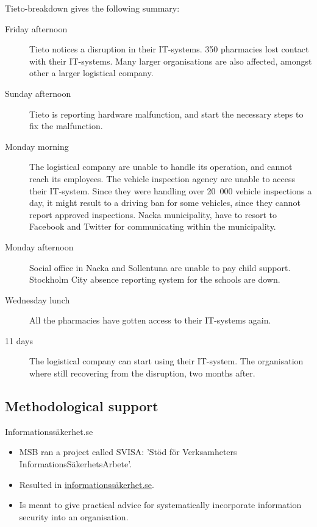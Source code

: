 \documentclass{beamer}
\begin{document}
\begin{frame}[allowframebreaks]{Tieto-breakdown}
  \cite{Lindkvist2012tdf} gives the following summary:
  \begin{description}
    \item[Friday afternoon] Tieto notices a disruption in their IT-systems.
      350 pharmacies lost contact with their IT-systems.
      Many larger organisations are also affected, amongst other a larger
      logistical company.

    \item[Sunday afternoon] Tieto is reporting hardware malfunction, and start
     the necessary steps to fix the malfunction.

    \item[Monday morning] The logistical company are unable to handle its
      operation, and cannot reach its employees.
      The vehicle inspection agency are unable to access their IT-system. Since
      they were handling over 20\, 000 vehicle inspections a day, it might
      result to a driving ban for some vehicles, since they cannot report
      approved inspections.
      Nacka municipality, have to resort to Facebook and Twitter for
      communicating within the municipality.

    \item[Monday afternoon] Social office in Nacka and Sollentuna are unable to
      pay child support.
      Stockholm City absence reporting system for the schools are down.

    \item[Wednesday lunch] All the pharmacies have gotten access to their
      IT-systems again.

    \item[11 days] The logistical company can start using their IT-system.
      The organisation where still recovering from the disruption, two months
      after.
  \end{description}
\end{frame}

\subsection{Methodological support}

\begin{frame}{Informationssäkerhet.se}
  \begin{itemize}
    \item MSB ran a project called SVISA\@: 'Stöd för Verksamheters 
      InformationsSäkerhetsArbete'.

    \item Resulted in \url{informationssäkerhet.se}.

    \item Is meant to give practical advice for systematically incorporate
      information security into an organisation.
  \end{itemize}
\end{frame}
\end{document}
